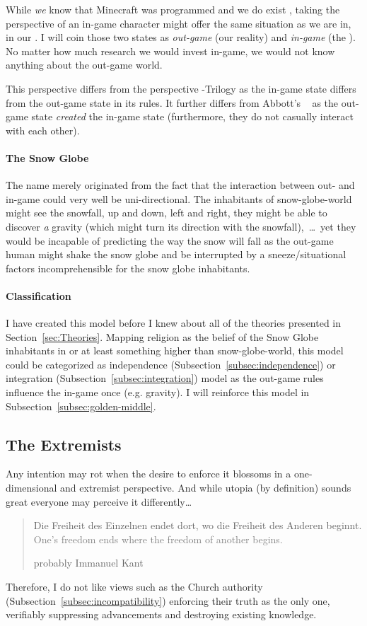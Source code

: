 While \emph{we} know that Minecraft was programmed and we do exist , taking the perspective of an in-game character might offer the same situation as we are in, in our . I will coin those two states as \emph{out-game} (our reality) and \emph{in-game} (the ).
No matter how much research we would invest in-game, we would not know anything about the out-game world.

This perspective differs from the perspective -Trilogy as the in-game state differs from the out-game state in its rules.
It further differs from Abbott's ~\cite{abbott1987flatland} as the out-game state \emph{created} the in-game state (furthermore, they do not casually interact with each other).

\paragraph{The Snow Globe}
The name  merely originated from the fact that the interaction between out- and in-game could very well be uni-directional.
The inhabitants of snow-globe-world might see the snowfall, up and down, left and right, they might be able to discover \textit{a} gravity (which might turn its direction with the snowfall),~\ldots\ yet they would be incapable of predicting the way the snow will fall as the out-game human might shake the snow globe and be interrupted by a sneeze/situational factors incomprehensible for the snow globe inhabitants.


\paragraph{Classification}
I have created this model before I knew about all of the theories presented in Section~\ref{sec:Theories}. Mapping religion as the belief of the Snow Globe inhabitants in  or at least something higher than snow-globe-world, this model could be categorized as independence (Subsection~\ref{subsec:independence}) or integration (Subsection~\ref{subsec:integration}) model as the out-game rules influence the in-game once (e.g. gravity).
I will reinforce this model in Subsection~\ref{subsec:golden-middle}.

\subsection{The Extremists}
Any intention may rot when the desire to enforce it blossoms in a one-dimensional and extremist perspective.
And while utopia (by definition) sounds great everyone may perceive it differently\ldots
\blockquote[probably Immanuel Kant]{Die Freiheit des Einzelnen endet dort, wo die Freiheit des Anderen beginnt.\\\textcolor{gray}{One's freedom ends where the freedom of another begins.}}
Therefore, I do not like views such as the Church authority (Subsection~\ref{subsec:incompatibility}) enforcing their truth as the only one, verifiably suppressing advancements and destroying existing knowledge.

